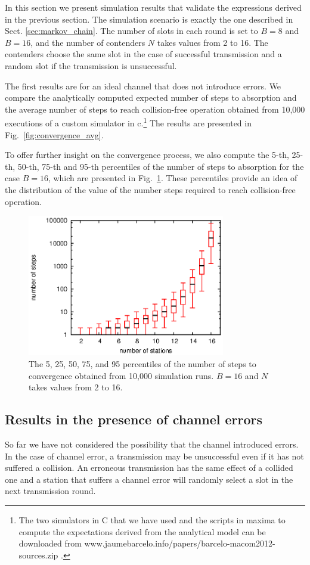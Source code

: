 \documentclass[journal]{IEEEtran}
\begin{document}
In this section we present simulation results that validate the expressions derived in the previous section.
The simulation scenario is exactly the one described in Sect. \ref{sec:markov_chain}.
The number of slots in each round is set to $B=8$ and $B=16$, and the number of contenders $N$ takes values from 2 to 16.
The contenders choose the same slot in the case of successful transmission and a random slot if the transmission is unsuccessful.

The first results are for an ideal channel that does not introduce errors.
We compare the analytically computed expected number of steps to absorption and the average number of steps to reach collision-free operation obtained from 10,000 executions of a custom simulator in c.\footnote{The two simulators in C that we have used and the scripts in maxima to compute the expectations derived from the analytical model can be downloaded from www.jaumebarcelo.info/papers/barcelo-macom2012-sources.zip .}
The results are presented in Fig.~\ref{fig:convergence_avg}.

To offer further insight on the convergence process, we also compute the 5-th, 25-th, 50-th, 75-th and 95-th percentiles of the number of steps to absorption for the case $B=16$, which are presented in Fig.~\ref{fig:convergence_stats}.
These percentiles provide an idea of the distribution of the value of the number steps required to reach collision-free operation.
\begin{figure}[h]
\centering
\includegraphics[height=6.2cm]{figures/convergence_stats}
\caption{The 5, 25, 50, 75, and 95 percentiles of the number of steps to convergence obtained from 10,000 simulation runs. $B=16$ and $N$ takes values from 2 to 16.}
\label{fig:convergence_stats}
\end{figure}


\subsection{Results in the presence of channel errors}
So far we have not considered the possibility that the channel introduced errors.
In the case of channel error, a transmission may be unsuccessful even if it has not suffered a collision.
An erroneous transmission has the same effect of a collided one and a station that suffers a channel error will randomly select a slot in the next transmission round.
\end{document}
